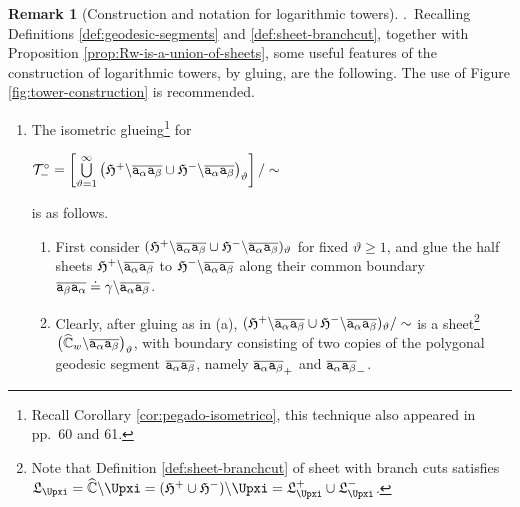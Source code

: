 \documentclass[final,3p,times]{elsarticle}
\newcommand{\CW}{\ensuremath{{\widehat{\mathbb C}}}}
\theoremstyle{definition}
\newtheorem{remark}[theorem]{Remark}
\begin{document}
\begin{remark}[Construction and notation for logarithmic towers]
.\
Recalling Definitions \ref{def:geodesic-segments} and \ref{def:sheet-branchcut},
together with Proposition \ref{prop:Rw-is-a-union-of-sheets}, 
some useful features of 
the construction of
logarithmic towers, by gluing, are the following.
The use of Figure \ref{fig:tower-construction} is recommended.

\begin{enumerate}[label=\roman*),leftmargin=*]

\item 
The isometric glueing\footnote{
Recall Corollary \ref{cor:pegado-isometrico}, 
this technique also appeared in
\cite{AlvarezMucino3} pp.~60 and 61.
} 
for 

\centerline{
$\mathcal{T}^{\circ}_{-} 
=\left[
\bigcup\limits_{\vartheta=1}^{\infty} \big( 
\mathfrak{H}^+ \backslash  \overline{{\tt a}_{\alpha} {\tt a}_{\beta}} 
\cup
\mathfrak{H}^- \backslash  \overline{{\tt a}_{\alpha} {\tt a}_{\beta}} 
\big)_{\vartheta} 
\right]/ \sim $}

\noindent
is as follows.

\begin{enumerate}[label=\alph*),leftmargin=*]
\item
First consider $( \mathfrak{H}^+ \backslash  \overline{{\tt a}_{\alpha} {\tt a}_{\beta}} 
\cup
\mathfrak{H}^- \backslash  \overline{{\tt a}_{\alpha} {\tt a}_{\beta}} )_{\vartheta}$
for fixed $\vartheta\geq 1$,
and glue the half sheets
$\mathfrak{H}^+ \backslash  \overline{{\tt a}_{\alpha} {\tt a}_{\beta}} $
to $\mathfrak{H}^- \backslash  \overline{{\tt a}_{\alpha} {\tt a}_{\beta}} $
along their common boundary 
$\overline{{\tt a}_{\beta} {\tt a}_{\alpha}}
\doteq
\gamma\backslash \overline{{\tt a}_{\alpha} {\tt a}_{\beta}}$.

\item
Clearly, after gluing as in (a), $( \mathfrak{H}^+ \backslash  \overline{{\tt a}_{\alpha} {\tt a}_{\beta}} 
\cup
\mathfrak{H}^- \backslash  \overline{{\tt a}_{\alpha} {\tt a}_{\beta}} )_{\vartheta} / \sim$ 
is a sheet\footnote{
Note that Definition \ref{def:sheet-branchcut} 
of sheet with branch cuts satisfies  
$\mathfrak{L}_\Upxi = 
\CW \backslash \Upxi =
(\mathfrak{H}^+ \cup \mathfrak{H}^-)\backslash \Upxi
=\mathfrak{L}^+_\Upxi  \cup \mathfrak{L}^-_\Upxi $.}
$\big( \CW_w \backslash  \overline{{\tt a}_{\alpha} {\tt a}_{\beta}} \big)_{\vartheta}$,
with boundary consisting of two copies
of the polygonal geodesic segment
$\overline{{\tt a}_{\alpha} {\tt a}_{\beta}}$, namely
$\overline{{\tt a}_{\alpha} {\tt a}_{\beta}}_+$ and $\overline{{\tt a}_{\alpha} {\tt a}_{\beta}}_-$.



\end{enumerate}
\end{enumerate}
\end{remark}
\end{document}
